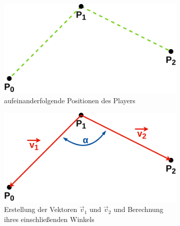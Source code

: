 \documentclass[doktyp=studarbeit]{TUBAFarbeiten}
\begin{document}
\begin{figure}[!htb]
    \centering
    \begin{subfigure}[b]{0.35\textwidth}
        \centering
        \includegraphics[width=1\linewidth]{Schlangenlinie-1.png}
        \caption{aufeinanderfolgende Positionen des Players}
    \end{subfigure}
    \qquad
    \begin{subfigure}[b]{0.35\textwidth}
        \centering
        \includegraphics[width=1\linewidth]{Schlangenlinie-2.png}
        \caption{Erstellung der Vektoren $\vec{v}_{1}$
        und $\vec{v}_{2}$ und Berechnung ihres einschließenden Winkels}
    \end{subfigure}
    \qquad
    \begin{subfigure}[b]{0.35\textwidth}
        \centering

\end{subfigure}
\end{figure}
\end{document}
